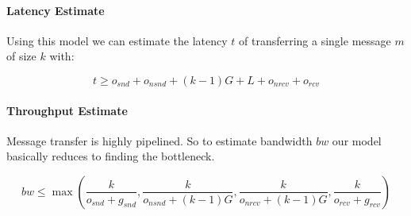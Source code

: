 \paragraph{Latency Estimate}

Using this model we can estimate the latency $t$ of transferring a single message $m$ of size $k$ with:

$$
t \geq o_{snd} + o_{nsnd}  + (k-1)G + L + o_{nrcv} + o_{rcv}
$$


\paragraph{Throughput Estimate}

Message transfer is highly pipelined. So to estimate bandwidth $bw$ our model basically reduces to finding the bottleneck.

$$
bw \leq \max ( \frac{k}{o_{snd} + g_{snd}}, \frac{k}{o_{nsnd} + (k-1)G}, \frac{k}{o_{nrcv} + (k-1)G}, \frac{k}{o_{rcv} + g_{rcv}})
$$
